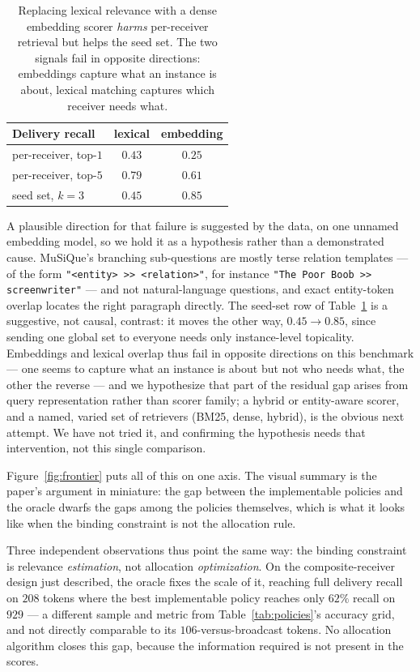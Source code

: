 \documentclass[sigconf,anonymous]{aamas}
\theoremstyle{remark}
\begin{document}
\begin{table}[t]
\centering
\caption{Replacing lexical relevance with a dense embedding scorer
\emph{harms} per-receiver retrieval but helps the seed set. The two
signals fail in opposite directions: embeddings capture what an
instance is about, lexical matching captures which receiver needs
what.}
\label{tab:scorer}
\begin{tabular}{lcc}
\toprule
Delivery recall & lexical & embedding \\
\midrule
per-receiver, top-$1$ & $\mathbf{0.43}$ & $0.25$ \\
per-receiver, top-$5$ & $\mathbf{0.79}$ & $0.61$ \\
seed set, $k{=}3$     & $0.45$ & $\mathbf{0.85}$ \\
\bottomrule
\end{tabular}
\end{table}

A plausible direction for that failure is suggested by the data, on
one unnamed embedding model, so we hold it as a hypothesis rather than
a demonstrated cause. MuSiQue's branching sub-questions are mostly
terse relation templates --- of the form
\texttt{"<entity> >> <relation>"}, for instance
\texttt{"The Poor Boob >> screenwriter"} --- and not natural-language
questions, and exact entity-token overlap locates the right paragraph
directly. The seed-set row of Table~\ref{tab:scorer} is a suggestive,
not causal, contrast: it moves the other way, $0.45 \to 0.85$, since
sending one global set to everyone needs only instance-level
topicality. Embeddings and lexical overlap thus fail in opposite
directions on this benchmark --- one seems to capture what an instance
is about but not who needs what, the other the reverse --- and we
hypothesize that part of the residual gap arises from query
representation rather than scorer family; a hybrid or entity-aware
scorer, and a named, varied set of retrievers (BM25, dense, hybrid), is
the obvious next attempt. We have not tried it, and confirming the
hypothesis needs that intervention, not this single comparison.

Figure~\ref{fig:frontier} puts all of this on one axis. The visual
summary is the paper's argument in miniature: the gap between the
implementable policies and the oracle dwarfs the gaps among the
policies themselves, which is what it looks like when the binding
constraint is not the allocation rule.

Three independent observations thus point the same way: the binding
constraint is relevance \emph{estimation}, not allocation
\emph{optimization}. On the composite-receiver design just described,
the oracle fixes the scale of it, reaching full delivery recall on
$208$ tokens where the best implementable policy reaches only $62\%$
recall on $929$ --- a different sample and metric from
Table~\ref{tab:policies}'s accuracy grid, and not directly comparable
to its $106$-versus-broadcast tokens. No allocation algorithm closes
this gap, because the information required is not present in the
scores.
\end{document}
